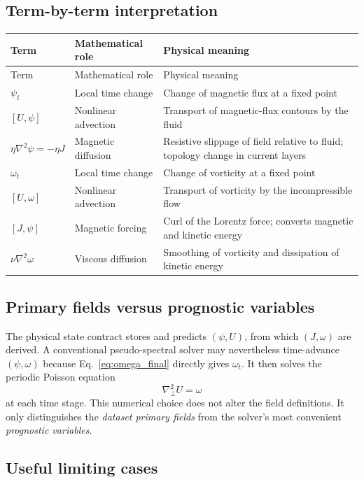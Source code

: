 \documentclass[11pt]{article}
\newcommand{\Lap}{\nabla_{\!\perp}^{2}}
\begin{document}
\subsection{Term-by-term interpretation}

\begin{longtable}{p{}p{}p{}}
\toprule
Term & Mathematical role & Physical meaning \\
\midrule
\endfirsthead
\toprule
Term & Mathematical role & Physical meaning \\
\midrule
\endhead
$\psi_t$ & Local time change & Change of magnetic flux at a fixed point \\
$[U,\psi]$ & Nonlinear advection & Transport of magnetic-flux contours by the fluid \\
$\eta\nabla^2\psi=-\eta J$ & Magnetic diffusion & Resistive slippage of field relative to fluid; topology change in current layers \\
$\omega_t$ & Local time change & Change of vorticity at a fixed point \\
$[U,\omega]$ & Nonlinear advection & Transport of vorticity by the incompressible flow \\
$[J,\psi]$ & Magnetic forcing & Curl of the Lorentz force; converts magnetic and kinetic energy \\
$\nu\nabla^2\omega$ & Viscous diffusion & Smoothing of vorticity and dissipation of kinetic energy \\
\bottomrule
\end{longtable}

\subsection{Primary fields versus prognostic variables}

The physical state contract stores and predicts $(\psi,U)$, from which $(J,\omega)$ are derived. A conventional pseudo-spectral solver may nevertheless time-advance $(\psi,\omega)$ because Eq.~\eqref{eq:omega_final} directly gives $\omega_t$. It then solves the periodic Poisson equation
\begin{equation}
\Lap U=\omega
\end{equation}
at each time stage. This numerical choice does not alter the field definitions. It only distinguishes the \emph{dataset primary fields} from the solver's most convenient \emph{prognostic variables}.

\subsection{Useful limiting cases}
\end{document}
